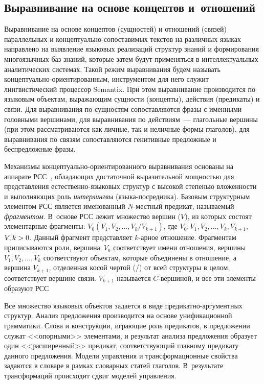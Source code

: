 \begin{multicols}{2}
\vspace*{-6pt}

    \section{Выравнивание на основе концептов и~отношений}

   Выравнивание на основе концептов (сущностей) и отношений (связей)
параллельных и концептуально-со\-по\-ста\-ви\-мых текстов на различных языках
направлено на выявление языковых реализаций структур знаний и формирования
многоязычных баз знаний, которые затем будут применяться в интеллектуальных
аналитических системах. Такой режим выравнивания будем называть
кон\-цеп\-ту\-ально-ори\-ен\-ти\-ро\-ван\-ным, инструментом для него служит
лингвистический процессор Semantix. При этом выравнивание производится по
языковым объектам, выражающим сущности (концепты), действия (предикаты) и
связи. Для выравнивания по сущностям сопоставляются фразы с именными
головными вершинами, для выравнивания по действиям~--- глагольные вершины
(при этом рассматриваются как личные, так и неличные формы глаголов), для
выравнивания по связям сопоставляются генитивные предложные и
беспредложные фразы.

   Механизмы концептуально-ориентированного выравнивания основаны на
аппарате РСС~\cite{8-koz}, обладающих
достаточной выразительной мощностью для представления естественно-языковых
структур с высокой степенью вложенности и выполняющих роль
\textit{интерлингвы} (языка-посредника). Базовым структурным элементом РСС
является именованный $N$-местный предикат, называемый \textit{фрагментом}.
В~основе РСС лежит множество вершин ($V$), из которых состоят элементарные
фрагменты: $V_0(V_1, V_2, \ldots , V_k/V_{k+1})$, где $V_0, V_1, V_2, \ldots , V_k,
V_{k+1}$, $V, k \hm> 0$. Данный фрагмент представляет $k$-арное отношение.
Фрагментам приписываются роли, вершина~$V_0$ соответствует имени
отношения, вершины $V_1, V_2, \ldots , V_k$ соответствуют объектам, которые
объединены в отношение, а вершина $V_{k+1}$, отделенная косой чертой (/) от всей
структуры в целом, соответствует вершине связи. $V_{k+1}$ называется
   $C$-вершиной, и все эти элементы образуют РСС~\cite{8-koz}

   Все множество языковых объектов задается в виде предикатно-аргументных
структур. Анализ предложения производится на основе унификационной
грамматики. Слова и конструкции, игра\-ющие роль предикатов, в предложении
служат <<опорными>> элементами, и результат анализа предложения образует один
<<расширенный>> предикат, соответствующий главному предикату данного
предложения. Модели управления и трансформационные свойства задаются в
словаре в рамках словарных статей глаголов. В~результате трансформаций
происходит сдвиг моделей управления.


\end{multicols}
